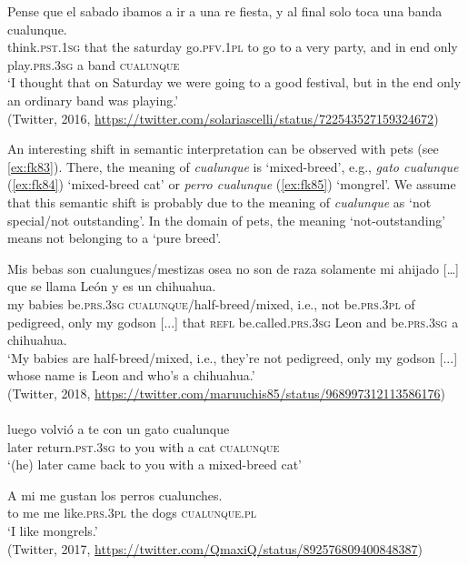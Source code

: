 \documentclass[output=paper,colorlinks,citecolor=brown]{langscibook}
\begin{document}
\ea \label{ex:fk82}
    \gll Pense que el sabado ibamos a ir a una re fiesta, y al final solo toca una banda cualunque.\\
    think.\textsc{pst.1sg} that the saturday go.\textsc{pfv.1pl} to go to a very party, and in end only play.\textsc{prs.3sg} a band \textsc{cualunque}\\
   \glt ‘I thought that on Saturday we were going to a good festival, but in the end only an ordinary band was playing.’\\
    (Twitter, 2016, \url{https://twitter.com/solariascelli/status/722543527159324672})
\z

An interesting shift in semantic interpretation can be observed with pets (see \ref{ex:fk83}). There, the meaning of \textit{cualunque} is ‘mixed-breed’, e.g., \textit{gato cualunque} (\ref{ex:fk84}) ‘mixed-breed cat’ or \textit{perro cualunque} (\ref{ex:fk85}) ‘mongrel’. We assume that this semantic shift is probably due to the meaning of \textit{cualunque} as ‘not special/not outstanding’. In the domain of pets, the meaning ‘not-outstanding’ means not belonging to a ‘pure breed’.

\ea \label{ex:fk83}
    \gll Mis bebas son cualungues/mestizas osea no son de raza solamente mi ahijado […] que se llama León y es un chihuahua.\\
    my babies be.\textsc{prs.3sg} \textsc{cualunque}/half-breed/mixed, i.e., not be.\textsc{prs.3pl} of pedigreed, only my godson [...] that \textsc{refl} be.called.\textsc{prs.3sg} Leon and be.\textsc{prs.3sg} a chihuahua.\\
    \glt ‘My babies are half-breed/mixed, i.e., they’re not pedigreed, only my godson [...] whose name is Leon and who’s a chihuahua.’\\
    (Twitter, 2018, \url{https://twitter.com/maruuchis85/status/968997312113586176})\\
    
     \ex \label{ex:fk84}\citep[][132]{Medina1989}\\
     \gll luego volvió a te con un gato cualunque\\
     later return.\textsc{pst.3sg} to you with a cat \textsc{cualunque}\\ 
    \glt ‘(he) later came back to you with a mixed-breed cat’
    
     \ex \label{ex:fk85}
     \gll A mi me gustan los perros cualunches.\\
     to me me like.\textsc{prs.3pl} the dogs \textsc{cualunque.pl}\\
    \glt ‘I like mongrels.’\\
    (Twitter, 2017, \url{https://twitter.com/QmaxiQ/status/892576809400848387})\\
\z
\end{document}

